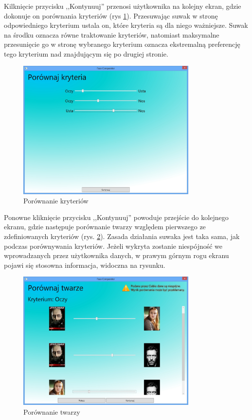 \documentclass[a4paper,notitlepage]{article}
\begin{document}
Kilknięcie przycisku ,,Kontynuuj'' przenosi użytkownika na kolejny ekran, gdzie dokonuje on porównania kryteriów (rys \ref{img_criterion_comparison}).
Przesuwając suwak w stronę odpowiedniego kryterium ustala on, które kryteria są dla niego ważniejsze.
Suwak na środku oznacza równe traktowanie kryteriów, natomiast maksymalne przesunięcie go w stronę wybranego kryterium oznacza ekstremalną preferencję tego kryterium nad znajdującym się po drugiej stronie.
	\begin{figure}[!htp]
	\centering
	\caption{Porównanie kryteriów}
	\label{img_criterion_comparison}
	\includegraphics[width=0.8\textwidth]{img/criterionComparison}
	\end{figure}

Ponowne kliknięcie przycisku ,,Kontynuuj'' powoduje przejście do kolejnego ekranu, gdzie następuje porównanie twarzy względem pierwszego ze zdefiniowanych kryteriów (rys. \ref{img_decisions_comparison}).
Zasada działania suwaka jest taka sama, jak podczas porównywania kryteriów.
Jeżeli wykryta zostanie niespójność we wprowadzanych przez użytkownika danych, w prawym górnym rogu ekranu pojawi się stosowna informacja, widoczna na rysunku.
	\begin{figure}[!htp]
	\centering
	\caption{Porównanie twarzy}
	\label{img_decisions_comparison}
	\includegraphics[width=0.8\textwidth]{img/decisionsComparison}
	\end{figure}
\end{document}

